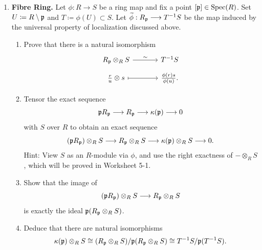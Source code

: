 \documentclass[12pt,reqno]{amsart}
\begin{document}
\begin{enumerate}[leftmargin=*, resume=problems]
\item\label{ex:fibre-ring} \textbf{Fibre Ring.} Let $\phi:R\to S$ be a ring map and fix a point $[\mathfrak{p}]\in \operatorname{Spec}(R)$. Set $U \coloneqq R \setminus \mathfrak{p}$ and $T\coloneqq \phi(U) \subset S$. Let $\widetilde{\phi}:R_{\mathfrak{p}}\longrightarrow T^{-1}S$ be the map induced by the universal property of localization discussed above. 
\begin{enumerate}
	\item\label{ex-pt:fibre-ring-iso} Prove that there is a natural isomorphism
	\[
	\begin{tikzcd}[row sep=.5em, column sep=3.5em]
	R_{\fp}\otimes_R S \arrow[r, "\sim"] & T^{-1}S \\
	\frac{r}{u}\otimes s \arrow[r, mapsto] & \frac{\phi(r)s}{\phi(u)}.
	\end{tikzcd}
	\]
	
	\item Tensor the exact sequence
	\[
	\mathfrak{p} R_{\mathfrak{p}}\longrightarrow R_{\mathfrak{p}}\longrightarrow \kappa(\mathfrak{p})\longrightarrow 0
	\]
	with $S$ over $R$ to obtain an exact sequence
	\[
	(\mathfrak{p} R_{\mathfrak{p}})\otimes_R S \longrightarrow R_{\mathfrak{p}}\otimes_R S \longrightarrow \kappa(\mathfrak{p})\otimes_R S \longrightarrow 0.
	\]
	Hint: View $S$ as an $R$-module via $\phi$, and use the right exactness of $-\otimes_R S$, which will be proved in Worksheet 5-1.
	
	\item Show that the image of
	\[
	(\mathfrak{p} R_{\mathfrak{p}})\otimes_R S \longrightarrow R_{\mathfrak{p}}\otimes_R S
	\]
	is exactly the ideal $\mathfrak{p}(R_{\mathfrak{p}}\otimes_R S)$.
	
	\item Deduce that there are natural isomorphisms
	\[
	\kappa(\mathfrak{p})\otimes_R S
	\cong
	(R_{\mathfrak{p}}\otimes_R S)/\mathfrak{p}(R_{\mathfrak{p}}\otimes_R S)
	\cong
	T^{-1}S/\mathfrak{p}(T^{-1}S).
	\]
\end{enumerate}


\end{enumerate}
\end{document}
